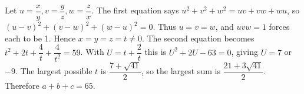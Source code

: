 Let $u=\dfrac{x}{y},v=\dfrac{y}{z},w=\dfrac{z}{x}$. The first equation says $u^2+v^2+w^2=uv+vw+wu$, so $(u-v)^2+(v-w)^2+(w-u)^2=0$. Thus $u=v=w$, and $uvw=1$ forces each to be 1. Hence $x=y=z=t\ne0$. The second equation becomes $t^2+2t+\dfrac{4}{t}+\dfrac{4}{t^2}=59$. With $U=t+\dfrac{2}{t}$ this is $U^2+2U-63=0$, giving $U=7$ or $-9$. The largest possible $t$ is $\dfrac{7+\sqrt{41}}{2}$, so the largest sum is $\dfrac{21+3\sqrt{41}}{2}$. Therefore $\boxed{a+b+c=65}$.
